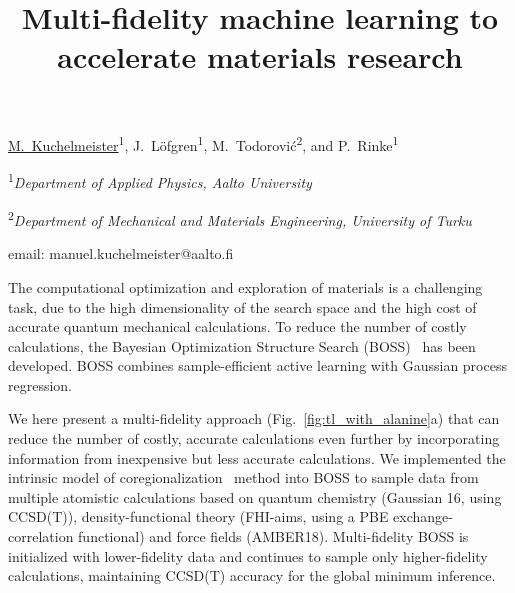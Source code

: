 \documentclass[12pt, a4paper]{article}
\begin{document}


\title{Multi-fidelity machine learning to accelerate materials research}

{\underline{M.~Kuchelmeister}\textsuperscript{1}, J.~Löfgren\textsuperscript{1},
M.~Todorović\textsuperscript{2}, and P.~Rinke\textsuperscript{1}}

{\textsuperscript{1}\em Department of Applied Physics, Aalto University}

{\textsuperscript{2}\em Department of Mechanical and Materials Engineering, University of Turku}

email: manuel.kuchelmeister@aalto.fi

\vspace{2\baselineskip}


The computational optimization and exploration of materials is a challenging task,
due to the high dimensionality of the search space and the high cost of accurate
quantum mechanical calculations. To reduce the number of costly calculations,
the Bayesian Optimization Structure Search (BOSS)~\cite{BOSS} has been developed.
BOSS combines sample-efficient active learning with Gaussian process regression.

We here present a multi-fidelity approach (Fig.~\ref{fig:tl_with_alanine}a) that
can reduce the number of costly, accurate calculations even further by
incorporating information from inexpensive but less accurate calculations.
We implemented the intrinsic model of coregionalization~\cite{ICM} method
into BOSS to sample data from multiple atomistic calculations
based on quantum chemistry (Gaussian 16, using CCSD(T)), density-functional theory 
(FHI-aims, using a PBE exchange-correlation functional) and force fields (AMBER18). 
Multi-fidelity BOSS is initialized with lower-fidelity data 
and continues to sample only higher-fidelity calculations, maintaining CCSD(T) 
accuracy for the global minimum inference.
\end{document}

